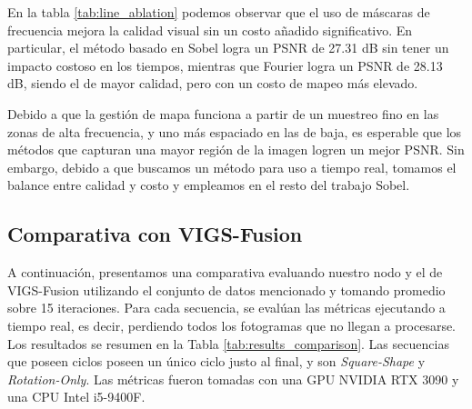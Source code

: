 En la tabla \ref{tab:line_ablation} podemos observar que el uso de máscaras de frecuencia mejora la calidad visual sin un costo añadido significativo. En particular, el método basado en Sobel logra un PSNR de 27.31 dB sin tener un impacto costoso en los tiempos, mientras que Fourier logra un PSNR de 28.13 dB, siendo el de mayor calidad, pero con un costo de mapeo más elevado.

Debido a que la gestión de mapa funciona a partir de un muestreo fino en las zonas de alta frecuencia, y uno más espaciado en las de baja, es esperable que los métodos que capturan una mayor región de la imagen logren un mejor PSNR. Sin embargo, debido a que buscamos un método para uso a tiempo real, tomamos el balance entre calidad y costo y empleamos en el resto del trabajo Sobel.

\subsection{Comparativa con VIGS-Fusion}

A continuación, presentamos una comparativa evaluando nuestro nodo y el de VIGS-Fusion utilizando el conjunto de datos mencionado y tomando promedio sobre 15 iteraciones. Para cada secuencia, se evalúan las métricas ejecutando a tiempo real, es decir, perdiendo todos los fotogramas que no llegan a procesarse. Los resultados se resumen en la Tabla \ref{tab:results_comparison}. Las secuencias que poseen ciclos poseen un único ciclo justo al final, y son \textit{Square-Shape} y \textit{Rotation-Only}. Las métricas fueron tomadas con una GPU NVIDIA RTX 3090 y una CPU Intel i5-9400F.


